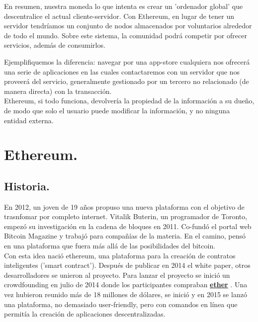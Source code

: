 \documentclass[11pt,a4paper]{article}
\begin{document}

En resumen, nuestra moneda lo que intenta es crear un 'ordenador global' que descentralice el actual cliente-servidor. Con Ethereum, en lugar de tener un servidor tendríamos un conjunto de nodos almacenados por voluntarios alrededor de todo el mundo. Sobre este sistema, la comunidad podrá competir por ofrecer servicios, además de consumirlos.


Ejemplifiquemos la diferencia: navegar por una app-store cualquiera nos ofrecerá una serie de aplicaciones en las cuales contactaremos con un servidor que nos proveerá del servicio, generalmente gestionado por un tercero no relacionado (de manera directa) con la transacción.\\

Ethereum, si todo funciona, devolvería la propiedad de la información a su dueño, de modo que solo el usuario puede modificar la información, y no ninguna entidad externa.\\



\section{Ethereum.\\}


\subsection{Historia.}
En 2012, un joven de 19 años propuso una nueva plataforma con el objetivo de trasnfomar por completo internet. Vitalik Buterin, un programador de Toronto, empezó su investigación en la cadena de bloques en 2011. Co-fundó el portal web Bitcoin Magazine y trabajó para compañías de la materia. En el camino, pensó en una plataforma que fuera más allá de las posibilidades del bitcoin.\\

Con esta idea nació ethereum, una plataforma para la creación de contratos inteligentes ('smart contract'). Después de publicar en 2014 el white paper, otros desarrolladores se unieron al proyecto. Para lanzar el proyecto se inició un crowdfounding en julio de 2014 donde los participantes compraban \hyperref[sec:ether]{\textbf{\underline{ether}}} . Una vez hubieron reunido más de 18 millones de dólares, se inició y en 2015 se lanzó una plataforma, no demasiado user-friendly, pero con comandos en línea que permitía la creación de aplicaciones descentralizadas.\\
\end{document}
